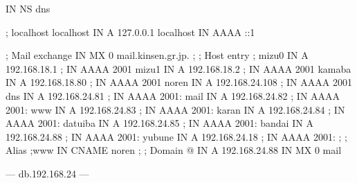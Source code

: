 \documentclass[mingoth,a4paper]{jsarticle}
\begin{document}
{{{{{{{{{{{{{{\begin{itemize}
\begin{commandline}
		IN      NS      dns

; localhost
localhost       IN      A       127.0.0.1
localhost       IN      AAAA    ::1

; Mail exchange
                IN      MX      0 mail.kinsen.gr.jp.
;
; Host entry
;
mizu0           IN      A       192.168.18.1
;               IN      AAAA    2001
mizu1           IN      A       192.168.18.2
;               IN      AAAA    2001
kamaba          IN      A       192.168.18.80
;               IN      AAAA    2001
noren           IN      A       192.168.24.108
;               IN      AAAA    2001
dns             IN      A       192.168.24.81
;               IN      AAAA    2001:
mail            IN      A       192.168.24.82
;               IN      AAAA    2001:
www             IN      A       192.168.24.83
;               IN      AAAA    2001:
karan           IN      A       192.168.24.84
;               IN      AAAA    2001:
datuiba         IN      A       192.168.24.85
;               IN      AAAA    2001:
bandai          IN      A       192.168.24.88
;               IN      AAAA    2001:
yubune          IN      A       192.168.24.18
;               IN      AAAA    2001:
;
; Alias
;www            IN      CNAME    noren
;
; Domain
@               IN      A       192.168.24.88
                IN      MX 0    mail
\end{commandline}
--- db.192.168.24 ---
\clearpage


\end{itemize}}}}}}}}}}}}}}}
\end{document}
